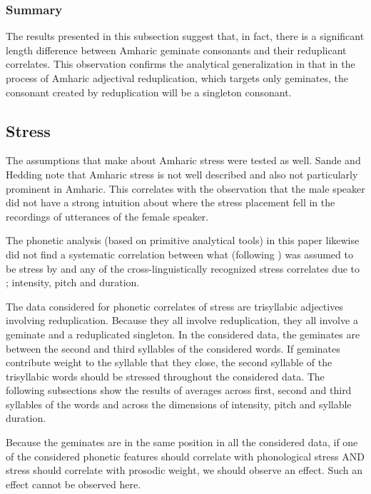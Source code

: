 \documentclass[12pt]{scrartcl}
\begin{document}
\subsubsection{Summary}

The results presented in this subsection suggest that, in fact, there is a significant length difference between Amharic geminate consonants and their reduplicant correlates. This observation confirms the analytical generalization in \cite{sande2017} that in the process of Amharic adjectival reduplication, which targets only geminates, the consonant created by reduplication will be a singleton consonant.



\subsection{Stress}

The assumptions that \cite{sande2017} make about Amharic stress were tested as well. Sande and Hedding note that Amharic stress is not well described and also not particularly prominent in Amharic. This correlates with the observation that the male speaker did not have a strong intuition about where the stress placement fell in the recordings of utterances of the female speaker.


The phonetic analysis (based on primitive analytical tools) in this paper likewise did not find a systematic correlation between what (following \cite{leslau-amharic-grammar}) was assumed to be stress by \cite{sande2017} and any of the cross-linguistically recognized stress correlates due to \cite{hayes1995}; intensity, pitch and duration.

The data considered for phonetic correlates of stress are trisyllabic adjectives involving reduplication. Because they all involve reduplication, they all involve a geminate and a reduplicated singleton. In the considered data, the geminates are between the second and third syllables of the considered words. If geminates contribute weight to the syllable that they close, the second syllable of the trisyllabic words should be stressed throughout the considered data. The following subsections show the results of averages across first, second and third syllables of the words and across the dimensions of intensity, pitch and syllable duration.

Because the geminates are in the same position in all the considered data, if one of the considered phonetic features should correlate with phonological stress AND stress should correlate with prosodic weight, we should observe an effect. Such an effect cannot be observed here.
\end{document}

